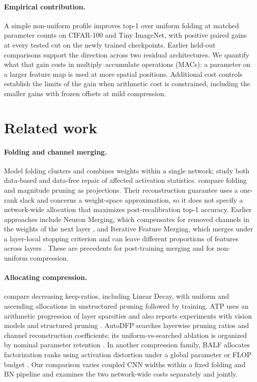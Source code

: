 \documentclass[11pt,a4paper]{article}
\begin{document}
\paragraph{Empirical contribution.} A simple non-uniform profile improves
top-1 over uniform folding at matched parameter counts on CIFAR-100 and
Tiny ImageNet, with positive paired gains at every tested cut on the
newly trained checkpoints. Earlier held-out comparisons support the
direction across two residual architectures. We quantify what that
gain costs in multiply--accumulate operations (MACs): a parameter on a
larger feature map is used at more spatial positions. Additional cost
controls establish the limits of the gain when arithmetic cost is
constrained, including the smaller gains with frozen offsets at mild
compression.

\section{Related work}

\paragraph{Folding and channel merging.}
Model folding clusters and combines weights within a single network;
\citet{wang2025fold} study both data-based and data-free repair of affected
activation statistics. \citet{saukh2026cut} compare folding and magnitude
pruning as projections. Their reconstruction guarantee uses a one-rank
slack and concerns a weight-space approximation, so it does not specify a
network-wide allocation that maximizes post-recalibration top-1 accuracy.
Earlier approaches include Neuron Merging, which compensates for removed
channels in the weights of the next layer \citep{kim2020merging}, and
Iterative Feature Merging, which merges under a layer-local stopping
criterion and can leave different proportions of features across layers
\citep[Sec.~4 and Appendix~C]{chen2023ifm}. These are precedents for
post-training merging and for non-uniform compression.

\paragraph{Allocating compression.}
\citet[Appendix~C.2]{su2020random} compare decreasing keep-ratios, including
Linear Decay, with uniform and ascending allocations in unstructured
pruning followed by training. ATP uses an arithmetic progression of
layer sparsities and also reports experiments with vision models and
structured pruning \citep[Eq.~10 and Appendix~F]{huang2025atp}.
AutoDFP searches layerwise pruning ratios and channel reconstruction
coefficients; its uniform-vs-searched ablation is organized by nominal
parameter retention \citep[Table~I]{li2024autodfp}. In another compression
family, BALF allocates factorization ranks using activation distortion
under a global parameter or FLOP budget \citep[Sec.~4.3]{gonzalez2026balf}.
Our comparison varies coupled CNN widths within a fixed folding and BN
pipeline and examines the two network-wide costs separately and jointly.
\end{document}
